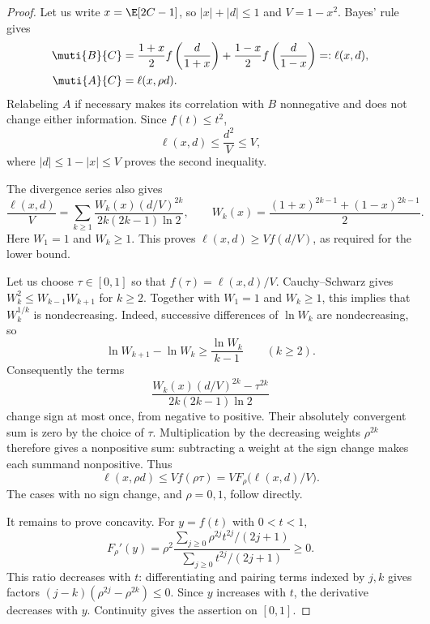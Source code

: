 \begin{proof}
Let us write $x=\E[2C-1]$, so $|x|+|d|\le1$ and
$V=1-x^2$. Bayes' rule gives
\begin{align*}
  \muti{B}{C}
  &=\frac{1+x}{2}f\left(\frac{d}{1+x}\right)
  +\frac{1-x}{2}f\left(\frac{d}{1-x}\right)
  =:\ell(x,d),\\
  \muti{A}{C}&=\ell(x,\rho d).
\end{align*}
Relabeling $A$ if necessary makes its correlation with $B$
nonnegative and does not change either information.
Since $f(t)\le t^2$,
\begin{equation*}
  \ell(x,d)\le\frac{d^2}{V}\le V,
\end{equation*}
where $|d|\le1-|x|\le V$ proves the second inequality.

The divergence series also gives
\begin{equation*}
  \frac{\ell(x,d)}V
  =\sum_{k\ge1}
  \frac{W_k(x)(d/V)^{2k}}{2k(2k-1)\ln2},
  \qquad
  W_k(x)=\frac{(1+x)^{2k-1}+(1-x)^{2k-1}}2.
\end{equation*}
Here $W_1=1$ and $W_k\ge1$. This proves
$\ell(x,d)\ge Vf(d/V)$, as required for the lower bound.

Let us choose $\tau\in[0,1]$ so that $f(\tau)=\ell(x,d)/V$.
Cauchy--Schwarz gives $W_k^2\le W_{k-1}W_{k+1}$ for $k\ge2$.
Together with $W_1=1$ and $W_k\ge1$, this implies that
$W_k^{1/k}$ is nondecreasing. Indeed, successive differences of
$\ln W_k$ are nondecreasing, so
\begin{equation*}
  \ln W_{k+1}-\ln W_k\ge\frac{\ln W_k}{k-1}
  \qquad(k\ge2).
\end{equation*}
Consequently the terms
\begin{equation*}
  \frac{W_k(x)(d/V)^{2k}-\tau^{2k}}{2k(2k-1)\ln2}
\end{equation*}
change sign at most once, from negative to positive.
Their absolutely convergent sum is zero by the choice of $\tau$.
Multiplication by the decreasing weights $\rho^{2k}$ therefore
gives a nonpositive sum: subtracting a weight at the sign change
makes each summand nonpositive.
Thus
\begin{equation*}
  \ell(x,\rho d)\le Vf(\rho\tau)
  =VF_\rho\bigl(\ell(x,d)/V\bigr).
\end{equation*}
The cases with no sign change, and $\rho=0,1$, follow directly.

It remains to prove concavity. For $y=f(t)$ with $0<t<1$,
\begin{equation*}
  F_\rho'(y)=\rho^2
  \frac{\sum_{j\ge0}\rho^{2j}t^{2j}/(2j+1)}
  {\sum_{j\ge0}t^{2j}/(2j+1)}\ge0.
\end{equation*}
This ratio decreases with $t$: differentiating and pairing
terms indexed by $j,k$ gives factors
$(j-k)(\rho^{2j}-\rho^{2k})\le0$.
Since $y$ increases with $t$, the derivative decreases with $y$.
Continuity gives the assertion on $[0,1]$.
\end{proof}

